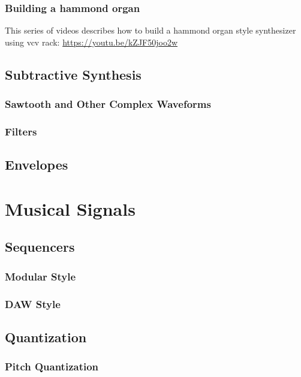 \documentclass[11pt]{article}
\begin{document}
\subsubsection{Building a hammond organ}
\label{sec:orgc2d97da}
This series of videos describes how to build a hammond organ style
synthesizer using vcv rack: \url{https://youtu.be/kZJF50joo2w}



\subsection{Subtractive Synthesis}
\label{sec:org74fa51c}
\subsubsection{Sawtooth and Other Complex Waveforms}
\label{sec:org6ac50c6}
\subsubsection{Filters}
\label{sec:org5a1c2fb}

\subsection{Envelopes}
\label{sec:orge0efa47}


\section{Musical Signals}
\label{sec:org72c67a0}
\subsection{Sequencers}
\label{sec:orgfa76215}
\subsubsection{Modular Style}
\label{sec:orga83c732}
\subsubsection{DAW Style}
\label{sec:org7319f46}
\subsection{Quantization}
\label{sec:orgc100e17}
\subsubsection{Pitch Quantization}
\label{sec:org0316514}
\end{document}
